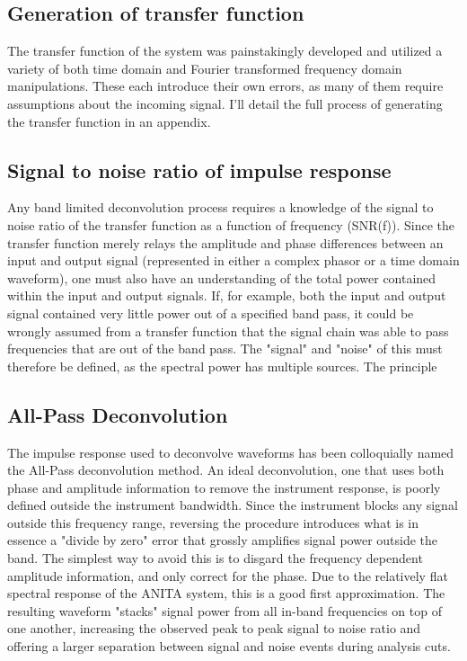 	\subsection{Generation of transfer function}
		The transfer function of the system was painstakingly developed and utilized a variety of both time domain and Fourier transformed frequency domain manipulations.  These each introduce their own errors, as many of them require assumptions about the incoming signal.  I'll detail the full process of generating the transfer function in an appendix.
	\subsection{Signal to noise ratio of impulse response}
		Any band limited deconvolution process requires a knowledge of the signal to noise ratio of the transfer function as a function of frequency (SNR(f)).  Since the transfer function merely relays the amplitude and phase differences between an input and output signal (represented in either a complex phasor or a time domain waveform), one must also have an understanding of the total power contained within the input and output signals.  If, for example, both the input and output signal contained very little power out of a specified band pass, it could be wrongly assumed from a transfer function that the signal chain was able to pass frequencies that are out of the band pass.
		The "signal" and "noise" of this must therefore be defined, as the spectral power has multiple sources.  The principle   
	\subsection{All-Pass Deconvolution}
		The impulse response used to deconvolve waveforms has been colloquially named the All-Pass deconvolution method.  An ideal deconvolution, one that uses both phase and amplitude information to remove the instrument response, is poorly defined outside the instrument bandwidth.  Since the instrument blocks any signal outside this frequency range, reversing the procedure introduces what is in essence a "divide by zero" error that grossly amplifies signal power outside the band.  The simplest way to avoid this is to disgard the frequency dependent amplitude information, and only correct for the phase.  Due to the relatively flat spectral response of the ANITA system, this is a good first approximation.  The resulting waveform "stacks" signal power from all in-band frequencies on top of one another, increasing the observed peak to peak signal to noise ratio and offering a larger separation between signal and noise events during analysis cuts.



